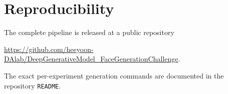 \documentclass{article}
\begin{document}
\section*{Reproducibility}
\label{sec:repro}
The complete pipeline is released at a public repository 

\url{https://github.com/heeyoon-DAlab/DeepGenerativeModel_FaceGenerationChallenge}. 

The exact per-experiment generation commands are documented in the repository \texttt{README}.



\end{document}
